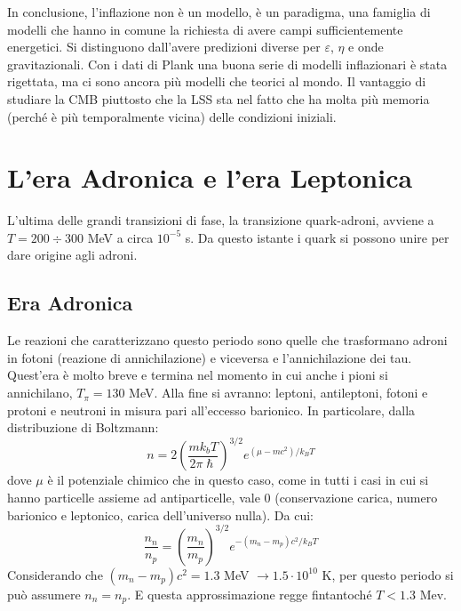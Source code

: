 \vspace{1em}
In conclusione, l'inflazione non è un modello, è un paradigma, una famiglia di modelli che hanno in comune la richiesta di avere campi sufficientemente energetici. Si distinguono dall'avere predizioni diverse per $\varepsilon$, $\eta$ e onde gravitazionali. Con i dati di Plank una buona serie di modelli inflazionari è stata rigettata, ma ci sono ancora più modelli che teorici al mondo. Il vantaggio di studiare la CMB piuttosto che la LSS sta nel fatto che ha molta più memoria (perché è più temporalmente vicina) delle condizioni iniziali. 


\section{L’era Adronica e l’era Leptonica}
L'ultima delle grandi transizioni di fase, la transizione quark-adroni, avviene a $T=200\div 300$ MeV a circa $10^{-5}$ s. Da questo istante i quark si possono unire per dare origine agli adroni. 

\subsection{Era Adronica}
Le reazioni che caratterizzano questo periodo sono quelle che trasformano adroni in fotoni (reazione di annichilazione) e viceversa e l'annichilazione dei tau. Quest'era è molto breve e termina nel momento in cui anche i pioni si annichilano, $T_\pi = 130$ MeV. Alla fine si avranno: leptoni, antileptoni, fotoni e protoni e neutroni in misura pari all'eccesso barionico. In particolare, dalla distribuzione di Boltzmann:
\begin{equation}
    n=2\left(\frac{mk_b T}{2\pi \hslash}\right)^{3/2}  e^{(\mu - mc^2)/{k_B T}} \label{eq:boltzmann}
\end{equation}
dove $\mu$ è il potenziale chimico che in questo caso, come in tutti i casi in cui si hanno particelle assieme ad antiparticelle, vale $0$ (conservazione carica, numero barionico e leptonico, carica dell'universo nulla). Da cui:
\begin{equation}
    \frac{n_n}{n_p}=\left(\frac{m_n}{m_p} \right)^{3/2}e^{-(m_n-m_p)c^2 / k_B T} \label{eq:nn-vs-np}
\end{equation}
Considerando che $(m_n-m_p)c^2=1.3$ MeV $\rightarrow 1.5\cdot 10^{10}$ K, per questo periodo si può assumere $n_n=n_p$. E questa approssimazione regge fintantoché $T<1.3$ Mev.


